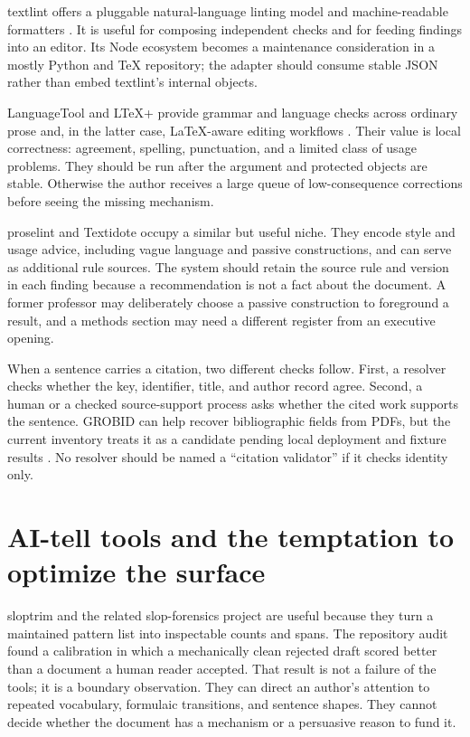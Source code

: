 textlint offers a pluggable natural-language linting model and machine-readable
formatters \citep{textlint2026docs}. It is useful for composing independent
checks and for feeding findings into an editor. Its Node ecosystem becomes a
maintenance consideration in a mostly Python and TeX repository; the adapter
should consume stable JSON rather than embed textlint's internal objects.

LanguageTool and LTeX+ provide grammar and language checks across ordinary
prose and, in the latter case, LaTeX-aware editing workflows
\citep{languagetool2026dev,ltexplus2026}. Their value is local correctness:
agreement, spelling, punctuation, and a limited class of usage problems. They
should be run after the argument and protected objects are stable. Otherwise
the author receives a large queue of low-consequence corrections before seeing
the missing mechanism.

proselint and Textidote occupy a similar but useful niche. They encode style
and usage advice, including vague language and passive constructions, and can
serve as additional rule sources. The system should retain the source rule and
version in each finding because a recommendation is not a fact about the
document. A former professor may deliberately choose a passive construction to
foreground a result, and a methods section may need a different register from
an executive opening.

When a sentence carries a citation, two different checks follow. First, a
resolver checks whether the key, identifier, title, and author record agree.
Second, a human or a checked source-support process asks whether the cited work
supports the sentence.
GROBID can help recover bibliographic fields from PDFs, but the current
inventory treats it as a candidate pending local deployment and fixture
results \citep{grobid2026}. No resolver should be named a ``citation validator''
if it checks identity only.

\section{AI-tell tools and the temptation to optimize the surface}
\label{sec:software-tells}

sloptrim and the related slop-forensics project are useful because they turn a
maintained pattern list into inspectable counts and spans. The repository audit
found a calibration in which a mechanically clean rejected draft scored better
than a document a human reader accepted. That result is not a failure of the
tools; it is a boundary observation. They can direct an author's attention to
repeated vocabulary, formulaic transitions, and sentence shapes. They cannot
decide whether the document has a mechanism or a persuasive reason to fund it.

